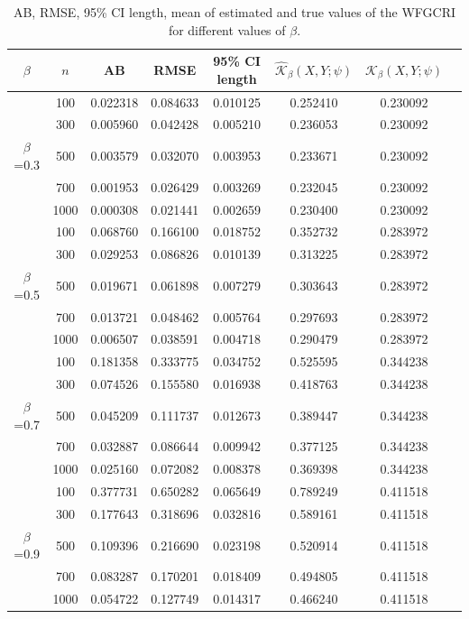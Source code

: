 \documentclass[12pt,a4paper]{article}
\numberwithin{equation}{section}
\begin{document}
\begin{table}[!htbp]\FloatBarrier
	\centering
	\caption{AB, RMSE, 95\% CI length, mean of estimated  and true values of the WFGCRI for different values of $\beta$.}\label{tab2}
	\label{tab:new}
	\begin{tabular}{cccccccc}
		\toprule
		$\beta$ & $n$ & AB & RMSE & 95\% CI length & $\widehat{\mathcal K}_\beta(X,Y;\psi)$ & ${\mathcal K_\beta}(X,Y;\psi)$ \\
		\toprule
		&100 &0.022318&0.084633&0.010125&0.252410&0.230092\\
		&300 &0.005960&0.042428&0.005210&0.236053&0.230092\\
		$\beta$=0.3&500 &0.003579&0.032070&0.003953&0.233671&0.230092\\
		&700 &0.001953&0.026429&0.003269&0.232045&0.230092\\
		&1000&0.000308&0.021441&0.002659&0.230400&0.230092\\
		\hline
		
		&100 &0.068760&0.166100&0.018752&0.352732&0.283972\\
		&300 &0.029253&0.086826&0.010139&0.313225&0.283972\\
		$\beta$=0.5&500 &0.019671&0.061898&0.007279&0.303643&0.283972\\
		&700 &0.013721&0.048462&0.005764&0.297693&0.283972\\
		&1000&0.006507&0.038591&0.004718&0.290479&0.283972\\
		\hline
		
		&100 &0.181358&0.333775&0.034752&0.525595&0.344238\\
		&300 &0.074526&0.155580&0.016938&0.418763&0.344238\\
		$\beta$=0.7&500 &0.045209&0.111737&0.012673&0.389447&0.344238\\
		&700 &0.032887&0.086644&0.009942&0.377125&0.344238\\
		&1000&0.025160&0.072082&0.008378&0.369398&0.344238\\
		\hline
		
		&100 &0.377731&0.650282&0.065649&0.789249&0.411518\\
		&300 &0.177643&0.318696&0.032816&0.589161&0.411518\\
		$\beta$=0.9&500 &0.109396&0.216690&0.023198&0.520914&0.411518\\
		&700 &0.083287&0.170201&0.018409&0.494805&0.411518\\
		&1000&0.054722&0.127749&0.014317&0.466240&0.411518\\
		\hline
		

\end{tabular}
\end{table}
\end{document}
